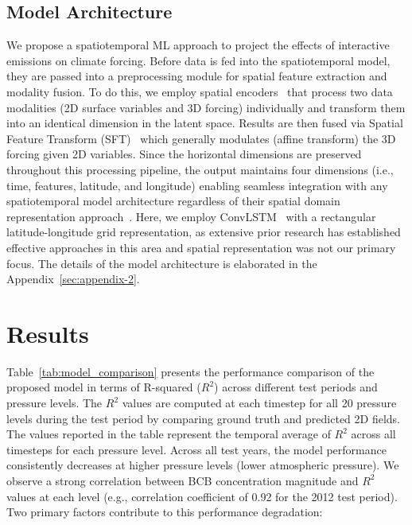 \documentclass{article}
\begin{document}
    \subsection{Model Architecture}
        We propose a spatiotemporal ML approach to project the effects of interactive emissions on climate forcing. Before data is fed into the spatiotemporal model, they are passed into a preprocessing module for spatial feature extraction and modality fusion. To do this, we employ spatial encoders~\cite{tan2023temporal} that process two data modalities (2D surface variables and 3D forcing) individually and transform them into an identical dimension in the latent space. Results are then fused via Spatial Feature Transform (SFT)~\cite{wang2018recovering} which generally modulates (affine transform) the 3D forcing given 2D variables. Since the horizontal dimensions are preserved throughout this processing pipeline, the output maintains four dimensions (i.e., time, features, latitude, and longitude) enabling seamless integration with any spatiotemporal model architecture regardless of their spatial domain representation approach~\cite{tan2023openstl}. Here, we employ ConvLSTM~\cite{shi2015convolutional} with a rectangular latitude-longitude grid representation, as extensive prior research has established effective approaches in this area and spatial representation was not our primary focus. The details of the model architecture is elaborated in the Appendix~\ref{sec:appendix-2}.
        
\section{Results}
    Table~\ref{tab:model_comparison} presents the performance comparison of the proposed model in terms of R-squared ($R^2$) across different test periods and pressure levels. The $R^2$ values are computed at each timestep for all 20 pressure levels during the test period by comparing ground truth and predicted 2D fields. The values reported in the table represent the temporal average of $R^2$ across all timesteps for each pressure level. Across all test years, the model performance consistently decreases at higher pressure levels (lower atmospheric pressure). We observe a strong correlation between BCB concentration magnitude and $R^2$ values at each level (e.g., correlation coefficient of 0.92 for the 2012 test period). Two primary factors contribute to this performance degradation:
\end{document}
